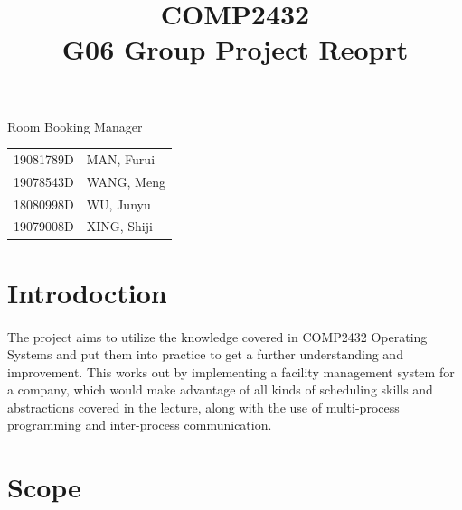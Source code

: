 \documentclass{article}
\title{\begin{center}\Huge COMP2432\\
    G06 Group Project Reoprt\end{center}}
\date{}
\author{}
\begin{document}
    \begin{titlepage}
        \maketitle
        \begin{center}
            \huge Room Booking Manager
            \vfill
            \begin{table}[!htbp]
                \centering
                \huge
                \begin{tabular}{ll}
                    19081789D\hspace{0.25in}&MAN, Furui \\
                    19078543D\hspace{0.25in}&WANG, Meng \\
                    18080998D\hspace{0.25in}&WU, Junyu  \\
                    19079008D\hspace{0.25in}&XING, Shiji\\
                \end{tabular}
            \end{table}
            \vspace{0.5in}
            \thispagestyle{empty}
        \end{center}
    \end{titlepage}
    \cleardoublepage
    \tableofcontents
    \thispagestyle{empty}
    \cleardoublepage
    \setcounter{page}{1}
    \section{Introdoction}
        \paragraph{}
        The project aims to utilize the knowledge covered in COMP2432 Operating Systems
        and put them into practice to get a further understanding and improvement. This
        works out by implementing a facility management system for a company, which
        would make advantage of all kinds of scheduling skills and abstractions covered
        in the lecture, along with the use of multi-process programming and inter-process
        communication. 
    \cleardoublepage
    \section{Scope}
\end{document}
